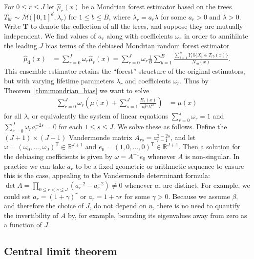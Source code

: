 \documentclass[11pt,lof]{puthesis}
\newcommand{\R}{\ensuremath{\mathbb{R}}}
\newcommand{\I}{\ensuremath{\mathbb{I}}}
\newcommand{\rd}{\ensuremath{\mathrm{d}}}
\newcommand{\bT}{\ensuremath{\mathbf{T}}}
\newcommand{\cM}{\ensuremath{\mathcal{M}}}
\newcommand{\T}{\ensuremath{\mathsf{T}}}
\theoremstyle{break}
\theoremstyle{proof}
\begin{document}
For $0 \leq r \leq J$ let $\hat \mu_r(x)$ be a Mondrian forest estimator
based on the trees $T_{b r} \sim \cM\big([0,1]^d, \lambda_r \big)$
for $1 \leq b \leq B$, where $\lambda_r = a_r \lambda$ for some $a_r > 0$
and $\lambda > 0$. Write $\bT$ to denote the collection of all the trees,
and suppose they are mutually independent. We find values of $a_r$ along with
coefficients $\omega_r$ in order to annihilate the leading $J$ bias terms of
the debiased Mondrian random forest estimator
%
\begin{align}
  \label{eq:mondrian_debiased}
  \hat \mu_\rd(x)
  &= \sum_{r=0}^J \omega_r \hat \mu_r(x)
  = \sum_{r=0}^{J} \omega_r
  \frac{1}{B} \sum_{b=1}^B
  \frac{\sum_{i=1}^n Y_i \, \I\big\{ X_i \in T_{r b}(x) \big\}} {N_{r b}(x)}.
\end{align}
%
This ensemble estimator retains the ``forest'' structure of the original
estimators, but with varying lifetime parameters $\lambda_r$ and coefficients
$\omega_r$. Thus by Theorem~\ref{thm:mondrian_bias} we want to solve
%
\begin{align*}
  \sum_{r=0}^{J} \omega_r
  \left( \mu(x) + \sum_{s=1}^{J} \frac{B_{s}(x)}{a_r^{2s} \lambda^{2s}} \right)
  &= \mu(x)
\end{align*}
%
for all $\lambda$, or equivalently the system of linear equations
$\sum_{r=0}^{J} \omega_r = 1$
and $\sum_{r=0}^{J} \omega_r a_r^{-2s} = 0$ for each $1 \leq s \leq J$.
We solve these as follows. Define the $(J+1) \times (J+1)$ Vandermonde matrix
$A_{r s} = a_{r-1}^{2-2s}$,
and let $\omega = (\omega_0, \ldots, \omega_J)^\T \in \R^{J+1}$
and $e_0 = (1, 0, \ldots, 0)^\T \in \R^{J+1}$.
Then a solution for the debiasing coefficients is given by
$\omega = A^{-1} e_0$ whenever $A$ is non-singular.
In practice we can take $a_r$ to be a fixed geometric or arithmetic sequence
to ensure this is the case, appealing to the Vandermonde determinant formula:
$\det A = \prod_{0 \leq r < s \leq J} (a_r^{-2} - a_s^{-2})
\neq 0$ whenever $a_r$ are distinct. For example, we could set
$a_r = (1 + \gamma)^r$ or $a_r = 1 + \gamma r$ for some $\gamma > 0$.
Because we assume $\beta$, and therefore the choice of $J$, do not
depend on $n$, there is no need to quantify
the invertibility of $A$ by, for example, bounding its eigenvalues
away from zero as a function of $J$.

\subsection{Central limit theorem}
\end{document}
